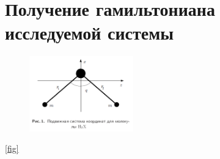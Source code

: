 \section{Получение гамильтониана исследуемой системы}

\begin{figure}[!ht]
  \centering
	\includegraphics[width=0.4\textwidth]{../pictures/Triatomic.png}
	\label{fig:triatomic}
\end{figure}

\eqref{fig}